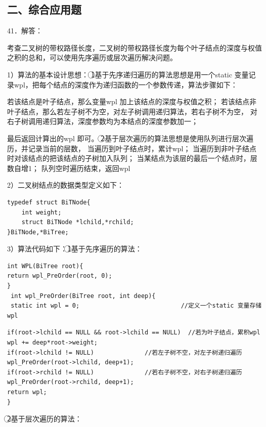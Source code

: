 \documentclass[UTF8,11pt]{ctexart}
\begin{document}
\subsection*{二、综合应用题}

41．解答：


考查二叉树的带权路径长度，二叉树的带权路径长度为每个叶子结点的深度与权值之积的总和，可以使用先序遍历或层次遍历解决问题。


1）算法的基本设计思想： \textcircled{1}基于先序递归遍历的算法思想是用一个static 变量记录wpl，把每个结点的深度作为递归函数的一个参数传递，算法步骤如下：


若该结点是叶子结点，那么变量wpl 加上该结点的深度与权值之积； 若该结点非叶子结点，那么若左子树不为空，对左子树调用递归算法，若右子树不为空， 对右子树调用递归算法，深度参数均为本结点的深度参数加一；


最后返回计算出的wpl 即可。 \textcircled{2}基于层次遍历的算法思想是使用队列进行层次遍历，并记录当前的层数， 当遍历到叶子结点时，累计wpl； 当遍历到非叶子结点时对该结点的把该结点的子树加入队列； 当某结点为该层的最后一个结点时，层数自增1； 队列空时遍历结束，返回wpl 


2）二叉树结点的数据类型定义如下：


\begin{Verbatim}[breaklines,breakanywhere,fontsize=\small]
typedef struct BiTNode{
    int weight;
    struct BiTNode *lchild,*rchild;
}BiTNode,*BiTree;
\end{Verbatim}

3）算法代码如下：\textcircled{1}基于先序遍历的算法：


\begin{Verbatim}[breaklines,breakanywhere,fontsize=\small]
int WPL(BiTree root){
return wpl_PreOrder(root, 0);
}
 int wpl_PreOrder(BiTree root, int deep){
 static int wpl = 0;                            //定义一个static 变量存储wpl
\end{Verbatim}

\begin{Verbatim}[breaklines,breakanywhere,fontsize=\small]
if(root->lchild == NULL && root->lchild == NULL)  //若为叶子结点，累积wpl
wpl += deep*root->weight;
if(root->lchild != NULL)              //若左子树不空，对左子树递归遍历
wpl_PreOrder(root->lchild, deep+1);
if(root->rchild != NULL)              //若右子树不空，对右子树递归遍历
wpl_PreOrder(root->rchild, deep+1);
return wpl;
}
\end{Verbatim}

\textcircled{2}基于层次遍历的算法：
\end{document}
